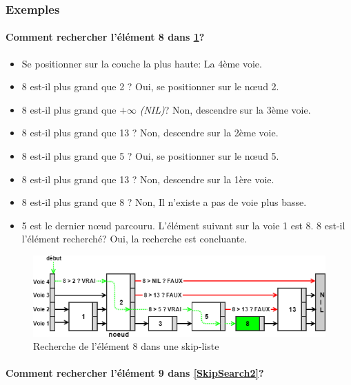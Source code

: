 \documentclass[hidelinks,a4paper, 12pt]{article}
\begin{document}
	\subsubsection{Exemples}	
	\paragraph*{Comment rechercher l'élément 8 dans \cref{SkipSearch1}?}
	\begin{itemize}
		\item Se positionner sur la couche la plus haute: La 4ème voie.
		\item 8 est-il plus grand que 2 ? Oui, se positionner sur le nœud 2.
		\item 8 est-il plus grand que $+\infty$ \textit{(NIL)}? Non, descendre sur la 3ème voie.
		\item 8 est-il plus grand que 13  ? Non, descendre sur la 2ème voie.
		\item 8 est-il plus grand que 5 ? Oui, se positionner sur le nœud 5.
		\item 8 est-il plus grand que 13 ? Non, descendre sur la 1ère voie.
		\item 8 est-il plus grand que 8 ? Non, Il n'existe a pas de voie plus basse.
		\item 5 est le dernier nœud parcouru. L'élément suivant sur la voie 1 est 8. 8 est-il l'élément recherché? Oui, la recherche est concluante.
	\end{itemize}
	\begin{figure}[h]
		\includegraphics[width=\textwidth]{img/search}
		\caption{Recherche de l'élément 8 dans une skip-liste}
		\label{SkipSearch1}
	\end{figure}
	
	\newpage
	\paragraph*{Comment rechercher l'élément 9 dans \cref{SkipSearch2}?}
	
\end{document}
